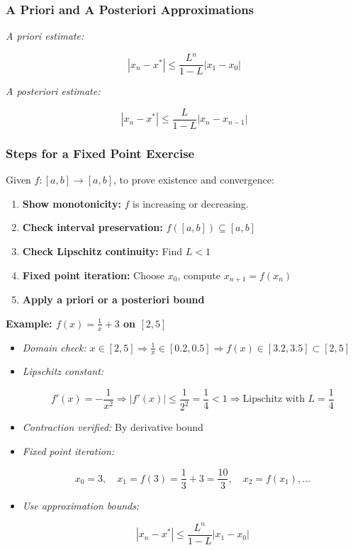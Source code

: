 \subsubsection{A Priori and A Posteriori Approximations}

\emph{A priori estimate:}

\[
    |x_n - x^*| \le \frac{L^n}{1 - L} |x_1 - x_0|
\]

\emph{A posteriori estimate:}

\[
    |x_n - x^*| \le \frac{L}{1 - L} |x_n - x_{n-1}|
\]

\subsubsection{Steps for a Fixed Point Exercise}

Given \(f: [a, b] \to [a, b]\), to prove existence and convergence:

\begin{enumerate}

    \item \textbf{Show monotonicity:} \(f\) is increasing or decreasing.

    \item \textbf{Check interval preservation:} \(f([a, b]) \subseteq [a, b]\)

    \item \textbf{Check Lipschitz continuity:} Find \(L < 1\)

    \item \textbf{Fixed point iteration:} Choose \(x_0\), compute \(x_{n+1} = f(x_n)\)

    \item \textbf{Apply a priori or a posteriori bound}

\end{enumerate}

\textbf{Example: \(f(x) = \frac{1}{x} + 3\) on \([2, 5]\)}

\begin{itemize}

    \item \emph{Domain check:} \(x \in [2, 5] \Rightarrow \frac{1}{x} \in [0.2, 0.5] \Rightarrow f(x) \in [3.2, 3.5] \subset [2, 5]\)

    \item \emph{Lipschitz constant:}

        \[
            f'(x) = -\frac{1}{x^2} \Rightarrow |f'(x)| \le \frac{1}{2^2} = \frac{1}{4} < 1
            \Rightarrow \text{Lipschitz with } L = \frac{1}{4}
        \]

    \item \emph{Contraction verified:} By derivative bound

    \item \emph{Fixed point iteration:}

        \[
            x_0 = 3, \quad x_1 = f(3) = \frac{1}{3} + 3 = \frac{10}{3}, \quad x_2 = f(x_1), \dots
        \]

    \item \emph{Use approximation bounds:}

        \[
            |x_n - x^*| \le \frac{L^n}{1 - L} |x_1 - x_0|
        \]
\end{itemize}